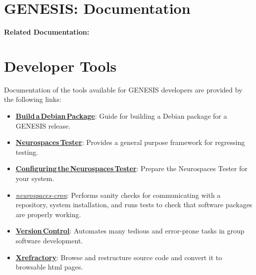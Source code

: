 \documentclass[12pt]{article}
\begin{document}
\section*{GENESIS: Documentation}

{\bf Related Documentation:}

\section*{Developer Tools}

Documentation of the tools available for GENESIS developers are provided by the following links:

\begin{itemize}
   \item[]\href{../build-debian/build-debian.tex}{\bf Build\,a\,Debian\,Package}: Guide for building a Debian package for a GENESIS release.
   \item[]\href{../neurospaces-tester/neurospaces-tester.tex}{\bf Neurospaces\,Tester}: Provides a general purpose framework for regressing testing. 
   \item[]\href{../tester-configuration/tester-configuration.tex}{\bf Configuring\,the\,Neurospaces\,Tester}: Prepare the Neurospaces Tester for your system.
   \item[]\href{../neurospaces-cron/neurospaces-cron.tex}{\it neurospaces-cron}: Performs sanity checks for communicating with a repository, system installation, and runs tests to check that software packages are properly working.
   \item[]\href{../version-control/version-control.tex}{\bf Version\,Control}: Automates many tedious and error-prone tasks in group software development.
   \item[]\href{../cxref/cxref.tex}{\bf Xrefractory}: Browse and restructure source code and convert it to browsable html pages. 

\end{itemize}
\end{document}
